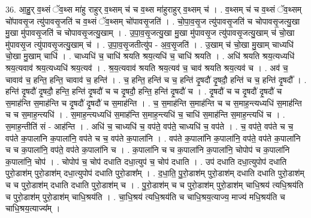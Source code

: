 \documentclass[17pt]{extarticle}
\begin{document}
36. आ॒हु॒र् व॒थ्सं ॅव॒थ्स मा॑हु राहुर् व॒थ्सम् च॑ च व॒थ्स मा॑हुराहुर् व॒थ्सम् च॑ । . व॒थ्सम् च॑ च व॒थ्सं ॅव॒थ्सम् चो॑पावसृ॒ज त्यु॑पावसृ॒जति॑ च व॒थ्सं ॅव॒थ्सम् चो॑पावसृ॒जति॑ । . चो॒पा॒व॒सृ॒ज त्यु॑पावसृ॒जति॑ च चोपावसृ॒जत्यु॒खा मु॒खा मु॑पावसृ॒जति॑ च चोपावसृ॒जत्यु॒खाम् । . उ॒पा॒व॒सृ॒जत्यु॒खा मु॒खा मु॑पावसृ॒ज त्यु॑पावसृ॒जत्यु॒खाम् च॑ चो॒खा मु॑पावसृ॒ज त्यु॑पावसृ॒जत्यु॒खाम् च॑ । . उ॒पा॒व॒सृ॒जतीत्यु॑प - अ॒व॒सृ॒जति॑ । . उ॒खाम् च॑ चो॒खा मु॒खाम् चाध्यधि॑ चो॒खा मु॒खाम् चाधि॑ । . चाध्यधि॑ च॒ चाधि॑ श्रयति श्रय॒त्यधि॑ च॒ चाधि॑ श्रयति । . अधि॑ श्रयति श्रय॒त्यध्यधि॑ श्रय॒त्यवाव॑ श्रय॒त्यध्यधि॑ श्रय॒त्यव॑ । . श्र॒य॒त्यवाव॑ श्रयति श्रय॒त्यव॑ च॒ चाव॑ श्रयति श्रय॒त्यव॑ च । . अव॑ च॒ चावाव॑ च॒ हन्ति॒ हन्ति॒ चावाव॑ च॒ हन्ति॑ । . च॒ हन्ति॒ हन्ति॑ च च॒ हन्ति॑ दृ॒षदौ॑ दृ॒षदौ॒ हन्ति॑ च च॒ हन्ति॑ दृ॒षदौ᳚ । . हन्ति॑ दृ॒षदौ॑ दृ॒षदौ॒ हन्ति॒ हन्ति॑ दृ॒षदौ॑ च च दृ॒षदौ॒ हन्ति॒ हन्ति॑ दृ॒षदौ॑ च । . दृ॒षदौ॑ च च दृ॒षदौ॑ दृ॒षदौ॑ च स॒माह॑न्ति स॒माह॑न्ति च दृ॒षदौ॑ दृ॒षदौ॑ च स॒माह॑न्ति । . च॒ स॒माह॑न्ति स॒माह॑न्ति च च स॒माह॒न्त्यध्यधि॑ स॒माह॑न्ति च च स॒माह॒न्त्यधि॑ । . स॒माह॒न्त्यध्यधि॑ स॒माह॑न्ति स॒माह॒न्त्यधि॑ च॒ चाधि॑ स॒माह॑न्ति स॒माह॒न्त्यधि॑ च । . स॒माह॒न्तीति॑ सं - आह॑न्ति । . अधि॑ च॒ चाध्यधि॑ च॒ वप॑ते॒ वप॑ते॒ चाध्यधि॑ च॒ वप॑ते । . च॒ वप॑ते॒ वप॑ते च च॒ वप॑ते क॒पाला॑नि क॒पाला॑नि॒ वप॑ते च च॒ वप॑ते क॒पाला॑नि । . वप॑ते क॒पाला॑नि क॒पाला॑नि॒ वप॑ते॒ वप॑ते क॒पाला॑नि च च क॒पाला॑नि॒ वप॑ते॒ वप॑ते क॒पाला॑नि च । . क॒पाला॑नि च च क॒पाला॑नि क॒पाला॑नि॒ चोपोप॑ च क॒पाला॑नि क॒पाला॑नि॒ चोप॑ । . चोपोप॑ च॒ चोप॑ दधाति दधा॒त्युप॑ च॒ चोप॑ दधाति । . उप॑ दधाति दधा॒त्युपोप॑ दधाति पुरो॒डाश॑म् पुरो॒डाश॑म् दधा॒त्युपोप॑ दधाति पुरो॒डाश᳚म् । . द॒धा॒ति॒ पु॒रो॒डाश॑म् पुरो॒डाश॑म् दधाति दधाति पुरो॒डाश॑म् च च पुरो॒डाश॑म् दधाति दधाति पुरो॒डाश॑म् च । . पु॒रो॒डाश॑म् च च पुरो॒डाश॑म् पुरो॒डाश॑म् चाधि॒श्रय॑ त्यधि॒श्रय॑ति च पुरो॒डाश॑म् पुरो॒डाश॑म् चाधि॒श्रय॑ति । . चा॒धि॒श्रय॑ त्यधि॒श्रय॑ति च चाधि॒श्रय॒त्याज्य॒ माज्य॑ मधि॒श्रय॑ति च चाधि॒श्रय॒त्याज्य᳚म् । \newline
\pagebreak
{}
\end{document}

